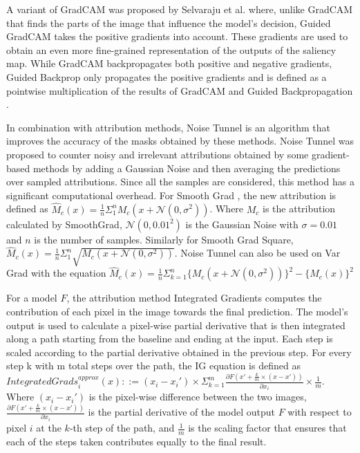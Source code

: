 A variant of GradCAM \cite{selvarajuGradCAMVisualExplanations} was proposed by Selvaraju et al. \cite{selvarajuGradCAMWhyDid2017} where, unlike GradCAM that finds the parts of the image that influence the model's decision, Guided GradCAM takes the positive gradients into account. These gradients are used to obtain an even more fine-grained representation of the outputs of the saliency map. While GradCAM backpropagates both positive and negative gradients, Guided Backprop only propagates the positive gradients and is defined as a pointwise multiplication of the results of GradCAM and Guided Backpropagation \cite{springenbergStrivingSimplicityAll2015}.

In combination with attribution methods, Noise Tunnel \cite{kokhlikyanCaptumUnifiedGeneric2020} is an algorithm that improves the accuracy of the masks obtained by these methods. Noise Tunnel was proposed to counter noisy and irrelevant attributions obtained by some gradient-based methods by adding a Gaussian Noise and then averaging the predictions over sampled attributions. Since all the samples are considered, this method has a significant computational overhead. For Smooth Grad \cite{smilkovSmoothGradRemovingNoise2017}, the new attribution is defined as $\hat M_{c}(x) = \frac{1}{n}\Sigma_{1}^{n}M_{c}(x + \mathcal{N}(0, \sigma^{2}))$. Where $M_{c}$ is the attribution calculated by SmoothGrad, $\mathcal {N}(0, 0.01^2)$ is the Gaussian Noise with $\sigma = 0.01$ and $n$ is the number of samples. Similarly for Smooth Grad Square, $\hat M_{c}(x) = \frac{1}{n}\Sigma_{1}^{n}\sqrt{M_{c}(x + \mathcal{N}(0, \sigma^{2}))}$. Noise Tunnel can also be used on Var Grad \cite{richterVarGradLowVarianceGradient2020} with the equation $\hat M_{c}(x) = \frac{1}{n}\Sigma_{k=1}^{n}\{M_{c}(x + \mathcal{N}(0, \sigma^{2}))\}^{2}- \{\hat M_{c}(x)\}^{2}$

For a model $F$, the attribution method Integrated Gradients \cite{sundararajanAxiomaticAttributionDeep2017} computes the contribution of each pixel in the image towards the final prediction. The model's output is used to calculate a pixel-wise partial derivative that is then integrated along a path starting from the baseline and ending at the input. Each step is scaled according to the partial derivative obtained in the previous step. For every step k with m total steps over the path, the IG equation is defined as $IntegratedGrads_i^{approx}(x)::=(x_{i}-x_i')\times \Sigma_{k=1}^{m}\frac{\partial F(x' + \frac{k}{m} \times (x-x'))}{\partial x_{i}} \times \frac{1}{m}$. Where $(x_{i} - x_{i}')$ is the pixel-wise difference between the two images, $\frac{\partial F(x' + \frac{k}{m} \times (x-x'))}{\partial x_i}$ is the partial derivative of the model output $F$ with respect to pixel $i$ at the $k$-th step of the path, and $\frac{1}{m}$ is the scaling factor that ensures that each of the steps taken contributes equally to the final result.

